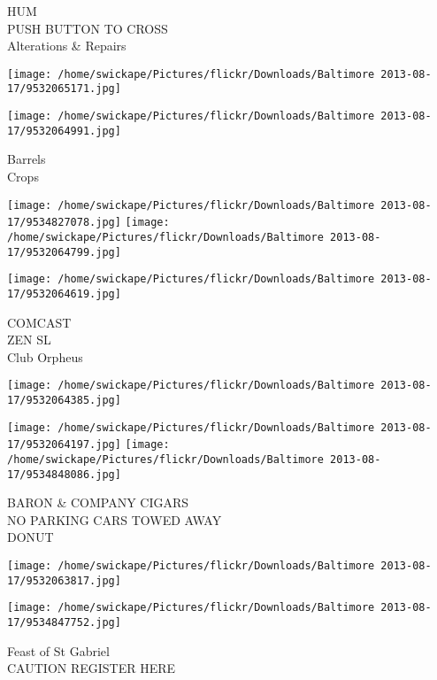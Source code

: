 \documentclass[10pt,letterpaper]{article}
\begin{document}
HUM\\
PUSH BUTTON TO CROSS\\
Alterations \& Repairs\\
\pagebreak

\texttt{[image: /home/swickape/Pictures/flickr/Downloads/Baltimore 2013-08-17/9532065171.jpg]}

\vspace{0.25in}
\texttt{[image: /home/swickape/Pictures/flickr/Downloads/Baltimore 2013-08-17/9532064991.jpg]}

Barrels\\
Crops\\
\pagebreak

\texttt{[image: /home/swickape/Pictures/flickr/Downloads/Baltimore 2013-08-17/9534827078.jpg]}
\texttt{[image: /home/swickape/Pictures/flickr/Downloads/Baltimore 2013-08-17/9532064799.jpg]}

\texttt{[image: /home/swickape/Pictures/flickr/Downloads/Baltimore 2013-08-17/9532064619.jpg]}

COMCAST\\
ZEN SL\\
Club Orpheus\\
\pagebreak

\texttt{[image: /home/swickape/Pictures/flickr/Downloads/Baltimore 2013-08-17/9532064385.jpg]}

\vspace{0.25in}
\texttt{[image: /home/swickape/Pictures/flickr/Downloads/Baltimore 2013-08-17/9532064197.jpg]}
\texttt{[image: /home/swickape/Pictures/flickr/Downloads/Baltimore 2013-08-17/9534848086.jpg]}

BARON \& COMPANY CIGARS\\
NO PARKING CARS TOWED AWAY\\
DONUT\\
\pagebreak

\texttt{[image: /home/swickape/Pictures/flickr/Downloads/Baltimore 2013-08-17/9532063817.jpg]}

\vspace{0.25in}
\texttt{[image: /home/swickape/Pictures/flickr/Downloads/Baltimore 2013-08-17/9534847752.jpg]}

Feast of St Gabriel\\
CAUTION REGISTER HERE\\
\pagebreak
\end{document}
